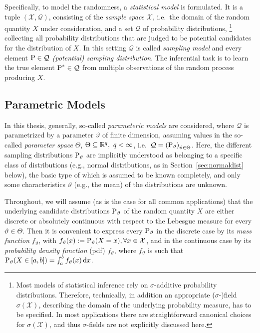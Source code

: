 Specifically, to model the randomness, a \emph{statistical model} is formulated.
It is a tuple $(\mathcal{X}, \mathcal{Q})$, consisting of the \emph{sample space} $\mathcal{X}$,
i.e.\ the domain of the random quantity $X$ under consideration,
and a set $\mathcal{Q}$ of probability distributions,%
\footnote{Most models of statistical inference rely on $\sigma$-additive probability distributions.
Therefore, technically, in addition an appropriate ($\sigma$-)field $\sigma(\mathcal{X})$,
describing the domain of the underlying probability measure, has to be specified.
In most applications there are straightforward canonical choices for $\sigma(\mathcal{X})$,
and thus $\sigma$-fields are not explicitly discussed here.}
collecting all probability distributions that are judged to be potential candidates for the distribution of $X$.
In this setting $\mathcal{Q}$ is called \emph{sampling model} and every element $\operatorname{P}\in \mathcal{Q}$ \emph{(potential) sampling distribution}.
The inferential task is to learn the true element $\operatorname{P}^* \in \mathcal{Q}$ from multiple observations of the random process producing $X$.


\subsection{Parametric Models}
\label{sec:parametricmodels}

In this thesis, generally, so-called \emph{parameteric models} are considered,
where $\mathcal{Q}$ is pa\-ra\-me\-trized by a parameter $\vartheta$ of finite dimension,
assuming values in the so-called \emph{parameter space} $\Theta$, $\Theta \subseteq \mathbb{R}^q, \ q < \infty$,
i.e.\ ${\cal Q}=\left(\operatorname{P}_\vartheta\right)_{\vartheta \in \Theta}$.
Here, the different sampling distributions $\operatorname{P}_\vartheta$ are implicitly understood as belonging to a specific class of distributions
(e.g., normal distributions, as in Section~\ref{sec:normaldist} below),
the basic type of which is assumed to be known completely,
and only some characteristics $\vartheta$ (e.g., the mean) of the distributions are unknown.

Throughout, we will assume (as is the case for all common applications)
that the underlying candidate distributions $\operatorname{P}_\vartheta$ of the random quantity $X$
are either discrete or absolutely continuous with respect to the Lebesgue measure
\parencite[see, e.g., ][pp.~32f, 38 for some technical details]{1993:karr} for every $\vartheta \in \Theta$.
Then it is convenient to express every $\operatorname{P}_\vartheta$ in the discrete case by its \emph{mass function} $f_\vartheta$,
with $f_\vartheta(x):=\operatorname{P}_\vartheta(X=x),\forall x \in \mathcal{X}$,
and in the continuous case by its \emph{probability density function} (pdf) $f_\vartheta$,
where $f_\vartheta$ is such that $\operatorname{P}_\vartheta(X \in [a,b]) = \int_a^b f_\vartheta(x) \,\mathrm{d} x$.

